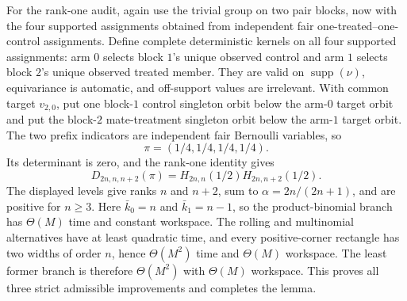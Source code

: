 For the rank-one audit, again use the trivial group on two pair blocks, now with the four supported assignments obtained from independent fair one-treated--one-control assignments. Define complete deterministic kernels on all four supported assignments: arm \(0\) selects block \(1\)'s unique observed control and arm \(1\) selects block \(2\)'s unique observed treated member. They are valid on \(\operatorname{supp}(\nu)\), equivariance is automatic, and off-support values are irrelevant. With common target \(v_{2,0}\), put one block-\(1\) control singleton orbit below the arm-\(0\) target orbit and put the block-\(2\) mate-treatment singleton orbit below the arm-\(1\) target orbit. The two prefix indicators are independent fair Bernoulli variables, so
\[
\pi=(1/4,1/4,1/4,1/4).
\tag{11}
\]
Its determinant is zero, and the rank-one identity gives
\[
D_{2n,n,n+2}(\pi)=H_{2n,n}(1/2)H_{2n,n+2}(1/2).
\tag{12}
\]
The displayed levels give ranks \(n\) and \(n+2\), sum to \(\alpha=2n/(2n+1)\), and are positive for \(n\ge3\). Here \(\bar k_0=n\) and \(\bar k_1=n-1\), so the product-binomial branch has \(\Theta(M)\) time and constant workspace. The rolling and multinomial alternatives have at least quadratic time, and every positive-corner rectangle has two widths of order \(n\), hence \(\Theta(M^2)\) time and \(\Theta(M)\) workspace. The least former branch is therefore \(\Theta(M^2)\) with \(\Theta(M)\) workspace. This proves all three strict admissible improvements and completes the lemma.